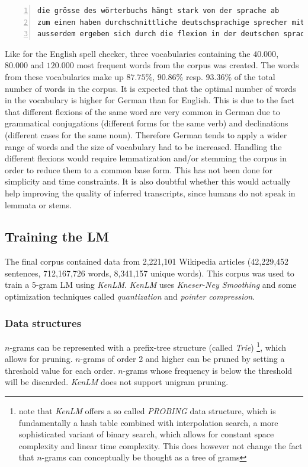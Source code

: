 \begin{lstlisting}[numbers=left, caption=Representation in corpus]
die grösse des wörterbuchs hängt stark von der sprache ab
zum einen haben durchschnittliche deutschsprachige sprecher mit circa <num> wörtern einen deutlich grösseren wortschatz als englischsprachige mit rund <num> wörtern
ausserdem ergeben sich durch die flexion in der deutschen sprache in etwa zehnmal so viele wortformen wie in der englischen sprache wo nur viermal so viele wortformen entstehen
\end{lstlisting}

Like for the English spell checker, three vocabularies containing the $40.000$, $80.000$ and $120.000$ most frequent words from the corpus was created. The words from these vocabularies make up $87.75\%$, $90.86\%$ resp. $93.36\%$ of the total number of words in the corpus. It is expected that the optimal number of words in the vocabulary is higher for German than for English. This is due to the fact that different flexions of the same word are very common in German due to grammatical conjugations (different forms for the same verb) and declinations (different cases for the same noun). Therefore German tends to apply a wider range of words and the size of vocabulary had to be increased. Handling the different flexions would require lemmatization and/or stemming the corpus in order to reduce them to a common base form. This has not been done for simplicity and time constraints. It is also doubtful whether this would actually help improving the quality of inferred transcripts, since humans do not speak in lemmata or stems.

\subsection{Training the \ac{LM}}

The final corpus contained data from 2,221,101 Wikipedia articles (42,229,452 sentences, 712,167,726 words, 8,341,157 unique words). This corpus was used to train a $5$-gram \ac{LM} using \textit{KenLM}. \textit{KenLM} uses \textit{Kneser-Ney Smoothing} and some optimization techniques called \textit{quantization} and \textit{pointer compression}. 

\subsubsection{Data structures}
$n$-grams can be represented with a prefix-tree structure (called \textit{Trie}) \footnote{note that \textit{KenLM} offers a so called \textit{PROBING} data structure, which is fundamentally a hash table combined with interpolation search, a more sophisticated variant of binary search, which allows for constant space complexity and linear time complexity. This does however not change the fact that $n$-grams can conceptually be thought as a tree of grams}, which allows for pruning. $n$-grams of order 2 and higher can be pruned by setting a threshold value for each order. $n$-grams whose frequency is below the threshold will be discarded. \textit{KenLM} does not support unigram pruning.

